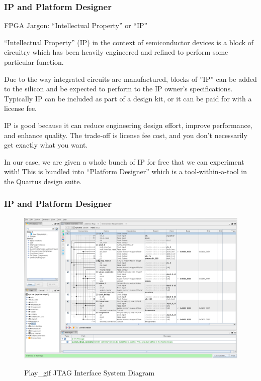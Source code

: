 \documentclass{beamer}
\begin{document}
\begin{frame}
\frametitle{IP and Platform Designer}

FPGA Jargon:  ``Intellectual Property'' or ``IP''

``Intellectual Property'' (IP) in the context of semiconductor devices is a block of circuitry which has been heavily engineered and refined to perform some particular function.

Due to the way integrated circuits are manufactured, blocks of ''IP'' can be added to the silicon and be expected to perform to the IP owner's specifications.  Typically IP can be included as part of a design kit, or it can be paid for with a license fee.

IP is good because it can reduce engineering design effort, improve performance, and enhance quality.  The trade-off is license fee cost, and you don't necessarily get exactly what you want.

In our case, we are given a whole bunch of IP for free that we can experiment with!  This is bundled into ``Platform Designer'' which is a tool-within-a-tool in the Quartus design suite.

\end{frame}

\begin{frame}
\frametitle{IP and Platform Designer}

\begin{figure}[h]
	\centering
	\includegraphics[width=1.0\textwidth]{graphics/platform_designer.pdf}
	\centering\bfseries
	\caption{Play\_gif JTAG Interface System Diagram}
\end{figure}

\end{frame}
\end{document}
